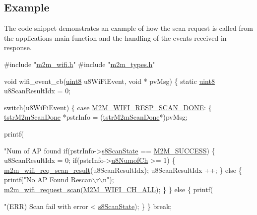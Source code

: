 \hypertarget{group__WifiEnableMonitorModeFn_Example}{}\subsection{Example}\label{group__WifiEnableMonitorModeFn_Example}
The code snippet demonstrates an example of how the scan request is called from the application\textquotesingle{}s main function and the handling of the events received in response. 
\begin{DoxyCode}
\textcolor{preprocessor}{#include "\hyperlink{m2m__wifi_8h}{m2m\_wifi.h}"}
\textcolor{preprocessor}{#include "\hyperlink{m2m__types_8h}{m2m\_types.h}"}

\textcolor{keywordtype}{void} wifi\_event\_cb(\hyperlink{group__DataT_ga4df709a77647e870bbf1d955b8edc9a6}{uint8} u8WiFiEvent, \textcolor{keywordtype}{void} * pvMsg)
\{
    \textcolor{keyword}{static} \hyperlink{group__DataT_ga4df709a77647e870bbf1d955b8edc9a6}{uint8}    u8ScanResultIdx = 0;
    
    \textcolor{keywordflow}{switch}(u8WiFiEvent)
    \{
    \textcolor{keywordflow}{case} \hyperlink{group__WlanEnums_gga064de09dec1d5e88ed8d075fa40f57dead835febbe18b7e3cc6ce4693951354fe}{M2M\_WIFI\_RESP\_SCAN\_DONE}:
        \{
            \hyperlink{structtstrM2mScanDone}{tstrM2mScanDone} *pstrInfo = (\hyperlink{structtstrM2mScanDone}{tstrM2mScanDone}*)pvMsg;
            
            printf(\textcolor{stringliteral}{"Num of AP found %
            \textcolor{keywordflow}{if}(pstrInfo->\hyperlink{structtstrM2mScanDone_adf06f5d0db8d0fb98e7674672ee8439d}{s8ScanState} == \hyperlink{nm__common_8h_a9ef27ba27aafdd1aa3a79d3ba2c36b8f}{M2M\_SUCCESS})
            \{
                u8ScanResultIdx = 0;
                \textcolor{keywordflow}{if}(pstrInfo->\hyperlink{structtstrM2mScanDone_a1303b806dd93bfdd4b4a51ad750b023b}{u8NumofCh} >= 1)
                \{
                    \hyperlink{group__WifiReqScanResult_ga2585ee08ee8ecac67155ec99dd4d0863}{m2m\_wifi\_req\_scan\_result}(u8ScanResultIdx);
                    u8ScanResultIdx ++;
                \}
                \textcolor{keywordflow}{else}
                \{
                    printf(\textcolor{stringliteral}{"No AP Found Rescan\(\backslash\)r\(\backslash\)n"});
                    \hyperlink{group__WifiRequestScanFn_ga499dfa24a19c2e84776aeabedf897135}{m2m\_wifi\_request\_scan}(\hyperlink{group__WlanEnums_gga2a91dd671e2672dba1a7ed45230f3a99a9ab262cc4f83b59a0710ffb80134c637}{M2M\_WIFI\_CH\_ALL});
                \}
            \}
            \textcolor{keywordflow}{else}
            \{
                printf(\textcolor{stringliteral}{"(ERR) Scan fail with error <%
      \hyperlink{structtstrM2mScanDone_adf06f5d0db8d0fb98e7674672ee8439d}{s8ScanState});
            \}
        \}
        \textcolor{keywordflow}{break};
    
}}
\end{DoxyCode}
